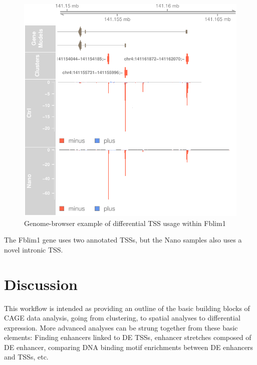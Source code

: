 \documentclass[9pt,a4paper,]{extarticle}
\begin{document}
\begin{figure}

{\centering \includegraphics{CAGEWorkflow_files/figure-latex/dtubrowser-1} 

}

\caption{Genome-browser example of differential TSS usage within Fblim1}\label{fig:dtubrowser}
\end{figure}

The Fblim1 gene uses two annotated TSSs, but the Nano samples also uses a novel intronic TSS.

\section{Discussion}\label{discussion}

This workflow is intended as providing an outline of the basic building blocks of CAGE data analysis, going from clustering, to spatial analyses to differential expression. More advanced analyses can be strung together from these basic elements: Finding enhancers linked to DE TSSs, enhancer stretches composed of DE enhancer, comparing DNA binding motif enrichments between DE enhancers and TSSs, etc.
\end{document}
